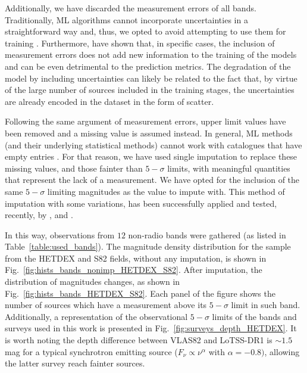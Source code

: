 \documentclass{aa}
\begin{document}
Additionally, we have discarded the measurement errors of all bands. Traditionally, ML algorithms cannot incorporate uncertainties in a straightforward way and, thus, we opted to avoid attempting to use them for training \citep[for some examples on how they can be incorporated in astrophysically motivated ML studies, see][]{2008ApJ...683...12B, 2019AJ....157...16R, 2022AJ....164....6S}. Furthermore, \citet{2022arXiv220913074H} have shown that, in specific cases, the inclusion of measurement errors does not add new information to the training of the models and can be even detrimental to the prediction metrics. The degradation of the model by including uncertainties can likely be related to the fact that, by virtue of the large number of sources included in the training stages, the uncertainties are already encoded in the dataset in the form of scatter.

Following the same argument of measurement errors, upper limit values have been removed and a missing value is assumed instead. In general, ML methods (and their underlying statistical methods) cannot work with catalogues that have empty entries \citep{allison2001missing}. For that reason, we have used single imputation \citep[a review on the use of this method in astronomy can be seen in][]{ChattopadhyayData} to replace these missing values, and those fainter than $5{-}\sigma$ limits, with meaningful quantities that represent the lack of a measurement. 
We have opted for the inclusion of the same $5{-}\sigma$ limiting magnitudes as the value to impute with. 
This method of imputation with some variations, has been successfully applied and tested, recently, by \citet{2020MNRAS.498.1750A, 2021Galax...9...86C, 2022MNRAS.512.2099C}, and \citet{2022MNRAS.514....1C}.

In this way, observations from $12$ non-radio bands were gathered (as listed in Table~\ref{table:used_bands}). 
The magnitude density distribution for the sample from the HETDEX and S82 fields, without any imputation, is shown in Fig.~\ref{fig:hists_bands_nonimp_HETDEX_S82}. After imputation, the distribution of magnitudes changes, as shown in Fig.~\ref{fig:hists_bands_HETDEX_S82}. Each panel of the figure shows the number of sources which have a measurement above its $5{-}\sigma$ limit in such band. 
Additionally, a representation of the observational $5{-}\sigma$ limits of the bands and surveys used in this work is presented in Fig.~\ref{fig:surveys_depth_HETDEX}. 
It is worth noting the depth difference between VLAS82 and LoTSS-DR1 is ${\sim}1.5$\,mag for a typical synchrotron emitting source ($F_\nu \propto \nu^{\alpha}$ with $\alpha {=}-0.8)$, allowing the latter survey reach fainter sources.%
\end{document}
